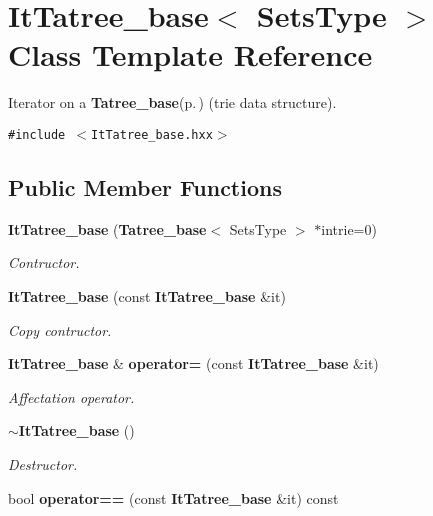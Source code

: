 \section{It\-Tatree\_\-base$<$ Sets\-Type $>$ Class Template Reference}
\label{class_it_tatree__base}
Iterator on a {\bf Tatree\_\-base}{\rm (p.\,\pageref{class_tatree__base})} (trie data structure).  


{\tt \#include $<$It\-Tatree\_\-base.hxx$>$}

\subsection*{Public Member Functions}
\begin{CompactItemize}
\item 
{\bf It\-Tatree\_\-base} ({\bf Tatree\_\-base}$<$ Sets\-Type $>$ $\ast$intrie=0)\label{class_it_tatree__base_2d56f24bb02592eb1d548b0ab6af39cb}

\begin{CompactList}\small\item\em Contructor. \item\end{CompactList}\item 
{\bf It\-Tatree\_\-base} (const {\bf It\-Tatree\_\-base} \&it)\label{class_it_tatree__base_4ccd6aa674f6a9f6a79d11f5e827df82}

\begin{CompactList}\small\item\em Copy contructor. \item\end{CompactList}\item 
{\bf It\-Tatree\_\-base} \& {\bf operator=} (const {\bf It\-Tatree\_\-base} \&it)\label{class_it_tatree__base_b293a7e6a8ecb1f17dcd2bba5c9f26f2}

\begin{CompactList}\small\item\em Affectation operator. \item\end{CompactList}\item 
{\bf $\sim$It\-Tatree\_\-base} ()\label{class_it_tatree__base_8c67bf39e9af3d2b8ee7ca3dbd34e1b7}

\begin{CompactList}\small\item\em Destructor. \item\end{CompactList}\item 
bool {\bf operator==} (const {\bf It\-Tatree\_\-base} \&it) const \label{class_it_tatree__base_1b8b4c04660ce0022167eae953b52b73}


\end{CompactItemize}
